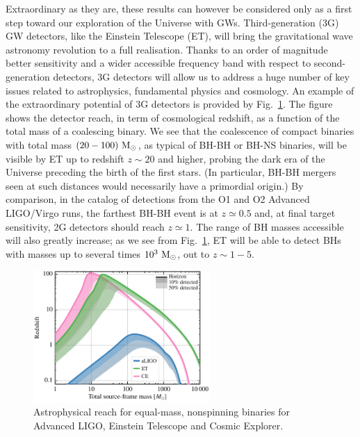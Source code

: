 Extraordinary as they are, these results can however be considered only as a first step toward our exploration of the Universe with GWs.
Third-generation (3G) GW detectors, like the Einstein Telescope (ET), will bring the  gravitational wave astronomy revolution to a full realisation. Thanks to an order of magnitude better sensitivity and a wider accessible frequency band with respect to second-generation detectors, 3G detectors will allow us to address a huge number of key issues related to  astrophysics, fundamental physics  and cosmology. 
An example of   the extraordinary potential of 3G detectors is provided  by Fig.~\ref{fig:gw_horizons}. The figure shows the detector reach, in term of cosmological redshift, as a function of the total mass of a coalescing binary. We see that the coalescence of  compact binaries with total mass  $(20-100)~\mathrm{M}_{\odot}$, as typical of BH-BH or BH-NS binaries, will be visible by ET up to redshift $z\sim 20$ and higher, probing the dark era of the Universe preceding the birth of the first stars. (In particular, BH-BH mergers seen at such distances would necessarily have a primordial origin.)
By comparison, in the catalog of  detections from the O1 and O2 Advanced LIGO/Virgo runs, the farthest BH-BH event is at $z\simeq 0.5$ and, at final target sensitivity, 2G detectors should reach $z\simeq 1$. The range of BH masses accessible will also greatly increase; as we see from  Fig.~\ref{fig:gw_horizons}, ET will be able to detect BHs with masses up to several times $10^3~\mathrm{M}_{\odot}$, out to $z\sim 1-5$.

\begin{figure}[t]
 \centering
 \includegraphics[width=0.6\textwidth]{Figures/gw_horizons_reduce.pdf}\qquad\qquad
 \caption{\small Astrophysical reach  for equal-mass, nonspinning binaries  for Advanced LIGO, Einstein Telescope and Cosmic Explorer. 
}
\label{fig:gw_horizons}
\end{figure}


